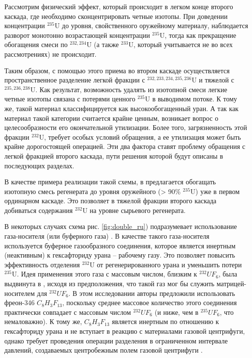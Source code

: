 Рассмотрим физический эффект, который происходит в легком конце второго каскада, где необходимо сконцентрировать четные изотопы.
При доведении концентрации $^{235}$U до уровня, свойственного оружейному материалу, наблюдается разворот монотонно возрастающей концентрации $^{235}$U, тогда как прекращение обогащения смеси по $^{232,234}$U (а также $^{233}$U, который учитывается не во всех рассмотрениях) не происходит.

Таким образом, с помощью этого приема во втором каскаде осуществляется пространственное разделение легкой фракции с $^{232,233,234,235,236}$U и тяжелой с $^{235,236,238}$U.
Как результат, возможность удалять из изотопной смеси легкие четные изотопы связана с потерями ценного $^{235}$U в выводимом потоке.
К тому же, такой материал классифицируется как высокообогащенный уран.
А так как материал такой категории считается крайне ценным, возникает вопрос о целесообразности его окончательной утилизации.
Более того, загрязненность этой фракции $^{232}$U, требует особых условий обращения, а ее утилизация может быть крайне дорогостоящей операцией.
Эти два фактора ставят проблему обращения с легкой фракцией второго каскада, пути решения которой будут описаны в последующих разделах.

В качестве примера реализации такой схемы, в \cite{vodolazskihSposobIzotopnogoVosstanovleniya} предлагается обогащать изотопную смесь регенерата до уровня оружейного (> 90\% $^{235}$U) уже в первом ординарном каскаде.
Это позволяет в тяжелой фракции второго каскада добиваться содержания $^{232}$U на уровне сырьевого регенерата.

В некоторых случаях схема рис. \ref{fig:double_ru}) подразумевает использование газа-носителя (или буферного газа) \cite{prusakovCorrectingIsotopicComposition2008, SposobIzotopnogoVosstanovleniyab}.
В качестве такого газа-носителя используется буферное газообразного соединения, которое является инертным (неактивным) к гексафториду урана -- рабочему газу. 
Это позволяет повысить эффективность отделения $^{232}$U от регенерированного урана и уменьшить потери $^{235}$U.
Идея применения этого газа с массовым числом, близким к $^{232}UF_6$, была выдвинута в \cite{SosninYuChelcov}, исходя из предположения, что такой газ мог бы служить матрицей-носителем для $^{232}UF_6$.
В этом исследовании авторы предложили использовать фреон-346 $C_{8}H_{3}F_{13}$, поскольку среднее массовое количество этого соединения практически совпадает с массовым числом $^{232}UF_6$ (и ниже, чем в $^{235}UF_6$, что немаловажно).
К тому же, $C_{8}H_{3}F_{13}$ является инертным по отношению к гексафториду урана и не вступает в реакцию с материалами газовой центрифуги, однако требует проведения операции разделения в ограниченном интервале давлений, создаваемых центробежным полем газовой центрифуги \cite{prusakovCorrectingIsotopicComposition2008}.

